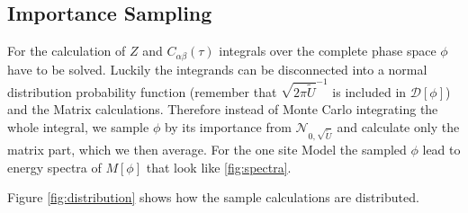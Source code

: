 \subsection{Importance Sampling}
For the calculation of $Z$ and $C_{\alpha\beta}(\tau)$ integrals over the complete phase space $\phi$ have to be solved. Luckily the integrands can be disconnected into a normal distribution probability function (remember that $\sqrt{2\pi\tilde{U}}^{-1}$ is included in $\mathcal{D}[\phi]$) and the Matrix calculations.
Therefore instead of Monte Carlo integrating the whole integral, we sample $\phi$ by its importance from $\mathcal{N}_{0, \sqrt{\tilde{U}}}$ and calculate only the matrix part, which we then average.
For the one site Model the sampled $\phi$ lead to energy spectra of $M[\phi]$ that look like \ref{fig:spectra}.

Figure \ref{fig:distribution} shows how the sample calculations are distributed.